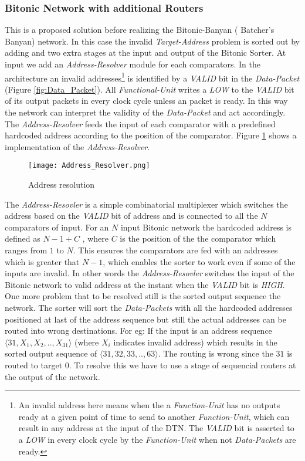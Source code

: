 				  \subsubsection{Bitonic Network with additional Routers}
					      This is a proposed solution before realizing the Bitonic-Banyan \cite{batcher_banyan_ref}( Batcher's Banyan)  network. In this case the invalid \textit{Target-Address} problem is sorted
					      out by adding and two extra stages at the input and output of the Bitonic Sorter. At input we add an \textit{Address-Resolver} module for each comparators. In the architecture an invalid 
					      addresses\footnote{An invalid address here means when the a \textit{Function-Unit} has no outputs ready at a given point of time to send to another \textit{Function-Unit}, 
					      which can result in any address at the input of the DTN. The \textit{VALID} bit is asserted to a \textit{LOW} in every clock cycle by the \textit{Function-Unit} when not \textit{Data-Packets} are ready.}
					      is identified by a \textit{VALID} bit in the \textit{Data-Packet} (Figure \ref{fig:Data_Packet}). All \textit{Functional-Unit} writes a \textit{LOW} to the \textit{VALID} bit of its output packets in every clock cycle unless an packet is ready. 
					      In this way the network can interpret the validity of the \textit{Data-Packet} and act accordingly. The \textit{Address-Resolver} feeds the input of each comparator with a predefined hardcoded address according to the position of the comparator. 
					      Figure \ref{fig:Address_Resolver} shows a implementation of the \textit{Address-Resolver}.
					      \begin{figure}[!ht]
							\texttt{[image: Address\_Resolver.png]}
						      \caption{Address resolution}
					      \label{fig:Address_Resolver}
					      \end{figure}
					      The \textit{Address-Resovler} is a simple combinatorial multiplexer which switches the address based on the \textit{VALID} bit of address and is connected to all the $N$ comparators of input.
					      For an $N$ input Bitonic network the hardcoded address is defined as $N -1 + C$ , where $C$ is the position of the the comparator which ranges from $1$ to $N$. This ensures the 
					      comparators are fed with an addresses which is greater that $N -1$, which enables the sorter to work even if some of the inputs are invalid. In other words the \textit{Address-Resovler}
					      switches the input of the Bitonic network to  valid address at the instant when the \textit{VALID} bit is \textit{HIGH}. One  more problem that to be resolved
					      still is the sorted output sequence the network. The sorter will sort the \textit{Data-Packets} with all the hardcoded addresses positioned at last of the address sequence but still the actual addresses can
					      be routed into wrong destinations. For eg: If the input is an address sequence $\langle31,X_{1},X_{2},..,X_{31}\rangle$ (where $X_{i}$ indicates invalid address) which results in the sorted output sequence 
					      of $\langle31,32,33,..,63\rangle$. The routing is wrong since the $31$ is routed to target $0$. To resolve this we have to use a stage of sequencial routers at the output of the network.
					      
